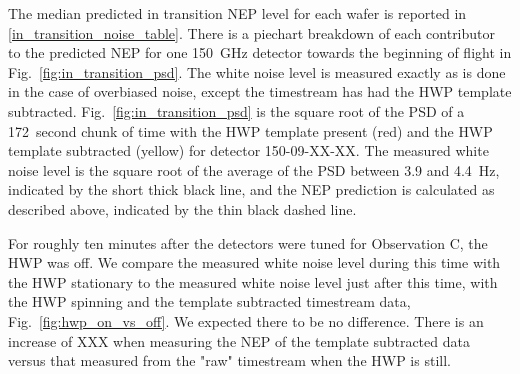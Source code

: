 The median predicted in transition \ac{NEP} level for each wafer is reported in \TAB\ref{in_transition_noise_table}. 
There is a piechart breakdown of each contributor to the predicted \ac{NEP} for one 150~GHz detector towards the beginning of flight in Fig.~\ref{fig:in_transition_psd}. 
The white noise level is measured exactly as is done in the case of overbiased noise, except the timestream has had the \ac{HWP} template subtracted. 
Fig.~\ref{fig:in_transition_psd} is the square root of the \ac{PSD} of a 172~second chunk of time with the \ac{HWP} template present (red) and the \ac{HWP} template subtracted (yellow) for detector 150-09-XX-XX. 
The measured white noise level is the square root of the average of the \ac{PSD} between 3.9 and 4.4~Hz, indicated by the short thick black line, and the \ac{NEP} prediction is calculated as described above, indicated by the thin black dashed line. 

For roughly ten minutes after the detectors were tuned for Observation C, the \ac{HWP} was off. 
We compare the measured white noise level during this time with the \ac{HWP} stationary to the measured white noise level just after this time, with the \ac{HWP} spinning and the template subtracted timestream data, Fig.~\ref{fig:hwp_on_vs_off}. 
We expected there to be no difference. 
There is an increase of XXX when measuring the \ac{NEP} of the template subtracted data versus that measured from the "raw" timestream when the \ac{HWP} is still. 

